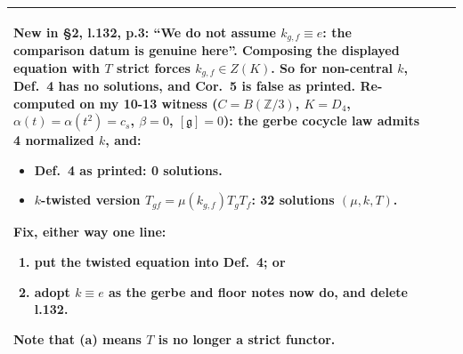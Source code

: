 \documentclass[10pt]{article}
\begin{document}
\begin{longtable}{>{\raggedright}p{2.3cm}>{\raggedright}p{1.4cm}p{12.6cm}}
  New in \S2, l.132, p.3: ``We do not assume $k_{g,f}\equiv e$: the comparison datum is genuine here''.
  Composing the displayed equation with $T$ strict forces $k_{g,f}\in Z(K)$. So for non-central $k$, Def.~4 has no solutions, and Cor.~5 is false as printed.
  Re-computed on my 10-13 witness ($C=B(\mathbb Z/3)$, $K=D_4$, $\alpha(t)=\alpha(t^2)=c_s$, $\beta=0$, $[\mathfrak g]=0$): the gerbe cocycle law admits 4 normalized $k$, and:
  \begin{itemize}
  \item Def.~4 as printed: \textbf{0} solutions.
  \item $k$-twisted version $T_{gf}=\mu(k_{g,f})T_gT_f$: \textbf{32} solutions $(\mu,k,T)$.
  \end{itemize}
  Fix, either way one line:
  \begin{enumerate}[label=(\alph*)]
  \item put the twisted equation into Def.~4; or
  \item adopt $k\equiv e$ as the gerbe and floor notes now do, and delete l.132.
  \end{enumerate}
  Note that (a) means $T$ is no longer a strict functor.\\
\bottomrule
\end{longtable}
\normalsize
\end{document}

